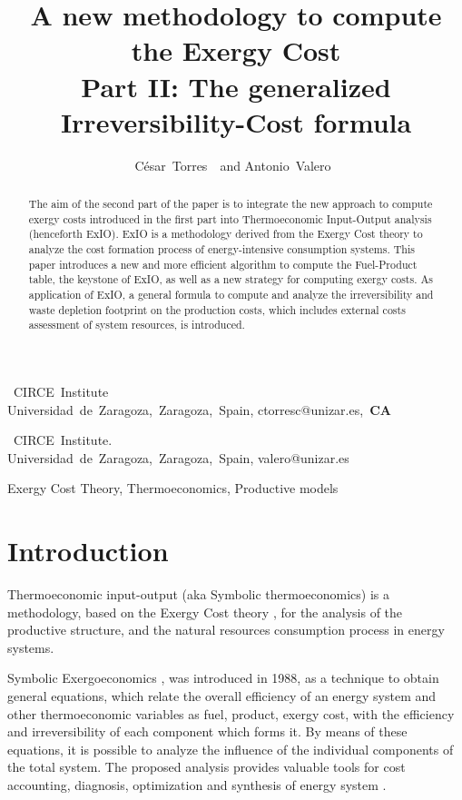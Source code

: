 \documentclass{ecos2018}
\title{A new methodology to compute the Exergy Cost\\ Part II: The generalized Irreversibility-Cost formula}
\author{%
      \mbox{C\'esar Torres \refauth{a}}~and
      \mbox{Antonio Valero \refauth{b}}}
\begin{document}
\maketitle

\begin{address}
 \mbox{ CIRCE Institute} \\
 \mbox{Universidad de Zaragoza, Zaragoza, Spain,}
 \mbox{ctorresc@unizar.es, \textbf{CA}} \par
 \mbox{ CIRCE Institute.} \\
 \mbox{Universidad de Zaragoza, Zaragoza, Spain,}
 \mbox{valero@unizar.es} \par
\end{address}

\begin{abstract}%
\begin{spacing}{1.1}
The aim of the second part of the paper is to integrate the new approach to compute exergy costs introduced in the first part into Thermoeconomic Input-Output analysis (henceforth ExIO). ExIO is a methodology derived from the Exergy Cost theory to analyze the cost formation process of energy-intensive
consumption systems. This paper introduces a new and more efficient algorithm to compute the Fuel-Product table, the keystone of ExIO, as well as a new strategy for computing exergy costs. 
As application of ExIO, a general formula to compute and analyze the irreversibility and waste depletion footprint on the production costs, which includes external costs assessment of system resources, is introduced.
\end{spacing}
\end{abstract}

\begin{keywords}
Exergy Cost Theory, Thermoeconomics, Productive models
\end{keywords}

\section{Introduction}
Thermoeconomic input-output (aka Symbolic thermoeconomics) is a methodology, based on the Exergy Cost theory \cite{Torres2017}, for the analysis of the productive structure, and the natural resources consumption process in energy systems.

Symbolic Exergoeconomics \cite{Torres1988}, was introduced in 1988, as a technique to obtain general equations, which relate the overall efficiency of an energy system and other thermoeconomic variables as fuel, product, exergy cost, with the efficiency and irreversibility of each component which forms it. By means of these equations, it is possible to analyze the influence of the individual components of the total system. The proposed analysis provides valuable tools for cost accounting, diagnosis, optimization and synthesis of energy system \cite{TADEUS2004,ISE2010}.
\end{document}
